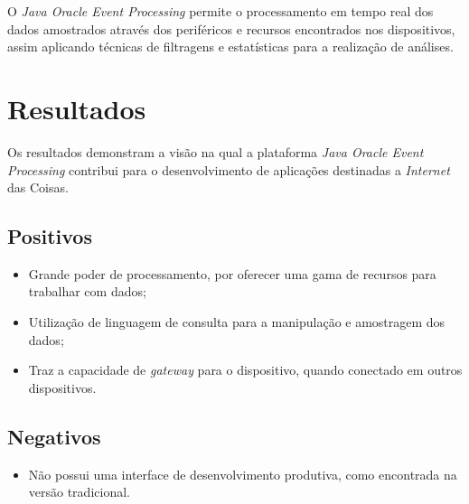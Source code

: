 O \textit{Java Oracle Event Processing} permite o processamento em tempo real 
dos dados amostrados através dos periféricos e recursos encontrados nos 
dispositivos, assim aplicando técnicas de filtragens e estatísticas para a 
realização de análises.

\section{Resultados}

Os resultados demonstram a visão na qual a plataforma \textit{Java Oracle Event 
Processing} contribui para o desenvolvimento de aplicações destinadas a 
\textit{Internet} das Coisas.

\subsection{Positivos}

\begin{itemize}
    
    \item Grande poder de processamento, por oferecer uma gama de recursos para 
    trabalhar com dados;
    
    \item Utilização de linguagem de consulta para a manipulação e amostragem 
    dos dados;
    
    \item Traz a capacidade de \textit{gateway} para o dispositivo, quando 
    conectado em outros dispositivos.
    
\end{itemize}

\subsection{Negativos}

\begin{itemize}
    
    \item Não possui uma interface de desenvolvimento produtiva, como 
    encontrada na versão tradicional.
    
\end{itemize}
